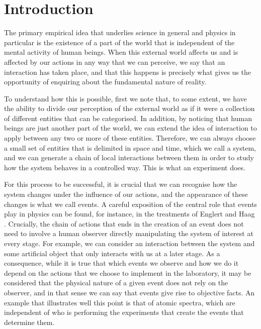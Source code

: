 \chapter{Introduction}
\label{chap:intro}

The primary empirical idea that underlies science in general and physics in particular is the existence of a part of the world that is independent of the mental activity of human beings. When this external world affects us and is affected by our actions in any way that we can perceive, we say that an interaction has taken place, and that this happens is precisely what gives us the opportunity of enquiring about the fundamental nature of reality.

To understand how this is possible, first we note that, to some extent, we have the ability to divide our perception of the external world as if it were a collection of different entities that can be categorised. In addition, by noticing that human beings are just another part of the world, we can extend the idea of interaction to apply between any two or more of these entities. Therefore, we can always choose a small set of entities that is delimited in space and time, which we call a system, and we can generate a chain of local interactions between them in order to study how the system behaves in a controlled way. This is what an experiment does.

For this process to be successful, it is crucial that we can recognise how the system changes under the influence of our actions, and the appearance of these changes is what we call events. A careful exposition of the central role that events play in physics can be found, for instance, in the treatments of Englert \cite{englert2013} and Haag \cite{haag1996, haag2016}. Crucially, the chain of actions that ends in the creation of an event does not need to involve a human observer directly manipulating the system of interest at every stage. For example, we can consider an interaction between the system and some artificial object that only interacts with us at a later stage. As a consequence, while it is true that which events we observe and how we do it depend on the actions that we choose to implement in the laboratory, it may be considered that the physical nature of a given event does not rely on the observer, and in that sense we can say that events give rise to objective facts. An example that illustrates well this point is that of atomic spectra, which are independent of who is performing the experiments that create the events that determine them.

